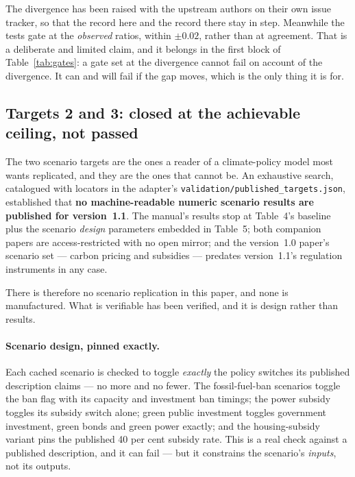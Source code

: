 The divergence has been raised with the upstream authors on their own issue tracker, so that the record here and the record there stay in step. Meanwhile the tests gate at the \emph{observed} ratios, within $\pm0.02$, rather than at agreement. That is a deliberate and limited claim, and it belongs in the first block of Table~\ref{tab:gates}: a gate set at the divergence cannot fail on account of the divergence. It can and will fail if the gap moves, which is the only thing it is for.

\subsection{Targets 2 and 3: closed at the achievable ceiling, not passed}
\label{sec:targets23}

The two scenario targets are the ones a reader of a climate-policy model most wants replicated, and they are the ones that cannot be. An exhaustive search, catalogued with locators in the adapter's \texttt{validation/published\_targets.json}, established that \textbf{no machine-readable numeric scenario results are published for version~1.1}. The manual's results stop at Table~4's baseline plus the scenario \emph{design} parameters embedded in Table~5; both companion papers \citep{georgedafermos2026scenario, georgedafermos2026mixes} are access-restricted with no open mirror; and the version~1.0 paper's scenario set --- carbon pricing and subsidies --- predates version~1.1's regulation instruments in any case.

There is therefore no scenario replication in this paper, and none is manufactured. What is verifiable has been verified, and it is design rather than results.

\paragraph{Scenario design, pinned exactly.} Each cached scenario is checked to toggle \emph{exactly} the policy switches its published description claims --- no more and no fewer. The fossil-fuel-ban scenarios toggle the ban flag with its capacity and investment ban timings; the power subsidy toggles its subsidy switch alone; green public investment toggles government investment, green bonds and green power exactly; and the housing-subsidy variant pins the published 40 per cent subsidy rate. This is a real check against a published description, and it can fail --- but it constrains the scenario's \emph{inputs}, not its outputs.

